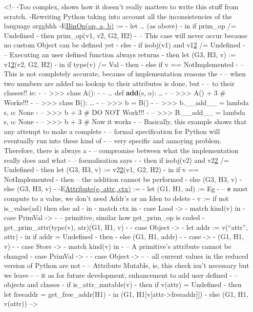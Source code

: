 \documentclass[
11pt, %
english, %
singlespacing, %
headsepline, %
]{MastersDoctoralThesis} %
\begin{document}
\textless{}!-- -Too complex, shows how it doesn't really matters to
write this stuff from scratch. -Rewriting Python taking into account all
the inconsistencies of the language argghhh -E\href{G,\%20H}{BinOp(op,
a, b)} := - let \ldots{} (as above) - in if prim\_op /= Undefined - then
prim\_op(v1, v2, G2, H2) - -- This case will never occur because no
custom Object can be defined yet - else - if isobj(v1) and
v1\href{\%22__add__\%22}{2} /= Undefined - -- Executing an user defined
function always returns - then let (G3, H3, v) :=
v1\href{\%22__add__\%22}{2}(v2, G2, H2) - in if type(v) /= Val - then -
else if v == NotImplemented - -- This is not completely accurate,
because of implementation reasons the - -- when two numbers are added no
lookup to their attributes is done, but - -- to their classes!! ie: - --
\textgreater{}\textgreater{}\textgreater{} class A(): - -- \ldots{} def
\textbf{add}(s, o): \ldots{} - --
\textgreater{}\textgreater{}\textgreater{} A() + 3 \# Works!!! - --
\textgreater{}\textgreater{}\textgreater{} class B(): \ldots{} - --
\textgreater{}\textgreater{}\textgreater{} b = B() - --
\textgreater{}\textgreater{}\textgreater{} b.\_\_add\_\_ = lambda s, o:
None - -- \textgreater{}\textgreater{}\textgreater{} b + 3 \# DO NOT
Work!!! - -- \textgreater{}\textgreater{}\textgreater{} B.\_\_add\_\_ =
lambda s, o: None - -- \textgreater{}\textgreater{}\textgreater{} b + 3
\# Now it works - -- Basically, this example shows that any attempt to
make a complete - -- formal specification for Python will eventually run
into these kind of - -- very specific and annoying problem. Therefore,
there is always a - -- compromise between what the implementation really
does and what - -- formalisation says - - then if isobj(v2) and
v2\href{\%22__radd__\%22}{2} /= Undefined - then let (G3, H3, v) :=
v2\href{\%22__radd__\%22}{2}(v1, G2, H2) - in if v == NotImplemented -
then -- the addition cannot be performed - else (G3, H3, v) - else (G3,
H3, v) - -E\href{G,\%20H}{Attribute(e, attr, ctx)} := - let (G1, H1, ad)
:= E\href{G,\%20H}{e} - -- \texttt{e} must compute to a value, we don't
need Addr's or an Iden to delete - v := if not is\_value(ad) then else
ad - in - match ctx in - case Load -\textgreater{} - match kind(v) in -
case PrimVal -\textgreater{} - -- primitive, similar how get\_prim\_op
is coded - get\_prim\_attr(type(v), atr)(G1, H1, v) - - case Object
-\textgreater{} - let addr := v(\enquote{attr}, attr) - in if addr =
Undefined - then - else (G1, H1, addr) - - case -\textgreater{} - (G1,
H1, v) - - case Store -\textgreater{} - match kind(v) in - -- A
primitive's attribute cannot be changed - case PrimVal -\textgreater{} -
- case Object -\textgreater{} - -- all current values in the reduced
version of Python are not - -- Attribute Mutable, ie, this check isn't
necessary but we leave - -- it as for future development, enhancement to
add user defined - -- objects and classes - if is\_attr\_mutable(v) -
then if v(attr) = Undefined - then let freeaddr = get\_free\_addr(H1) -
in (G1, H1{[}v{[}attr-\textgreater{}freeaddr{]}{]}) - else (G1, H1,
v(attr)) --\textgreater{} \fi
\end{document}
